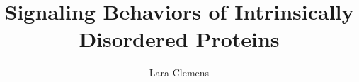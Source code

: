 \documentclass[onecolumn]{article}
\begin{document}
\title{Signaling Behaviors of Intrinsically Disordered Proteins}
\author{Lara Clemens}
\date{}

\maketitle

\newpage

\tableofcontents

\newpage



%

\graphicspath{{Background/}}



\graphicspath{{ModelDevelopment/}}



\graphicspath{{Results/LocalStructuring/}}



\graphicspath{{Results/Electrostatics/}}



\graphicspath{{Results/SimultaneousBinding/}}



\graphicspath{{Results/SurfaceEffects/}}



\graphicspath{{Timeline/}}




%







\end{document}
